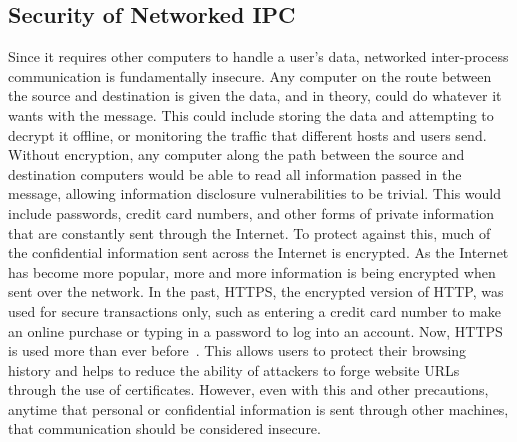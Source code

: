 \subsection{Security of Networked IPC}
\label{sec:networkedIPCSecurity}
Since it requires other computers to handle a user's data, networked inter-process communication is fundamentally insecure.  Any computer on the route between the source and destination is given the data, and in theory, could do whatever it wants with the message.  This could include storing the data and attempting to decrypt it offline, or monitoring the traffic that different hosts and users send.  Without encryption, any computer along the path between the source and destination computers would be able to read all information passed in the message, allowing information disclosure vulnerabilities to be trivial.  This would include passwords, credit card numbers, and other forms of private information that are constantly sent through the Internet.  To protect against this, much of the confidential information sent across the Internet is encrypted.  As the Internet has become more popular, more and more information is being encrypted when sent over the network.  In the past, HTTPS, the encrypted version of HTTP, was used for secure transactions only, such as entering a credit card number to make an online purchase or typing in a password to log into an account.  Now, HTTPS is used more than ever before~\cite{google_transparency_report}.  This allows users to protect their browsing history and helps to reduce the ability of attackers to forge website URLs through the use of certificates.  However, even with this and other precautions, anytime that personal or confidential information is sent through other machines, that communication should be considered insecure.

